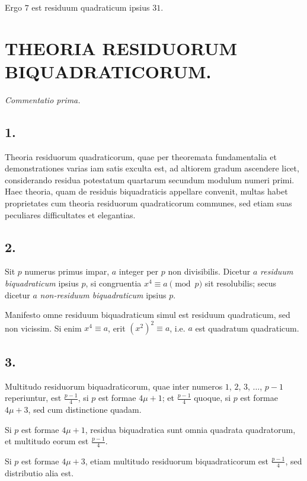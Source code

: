 \documentclass[12pt,a4paper]{article}
\theoremstyle{plain}
\theoremstyle{definition}
\theoremstyle{remark}
\begin{document}
Ergo $7$ est residuum quadraticum ipsius $31$.


\newpage
\section*{THEORIA RESIDUORUM BIQUADRATICORUM.}

\begin{center}
\textit{Commentatio prima.}
\end{center}

\subsection*{1.}
Theoria residuorum quadraticorum, quae per theoremata fundamentalia et demonstrationes varias iam satis exculta est, ad altiorem gradum ascendere licet, considerando residua potestatum quartarum secundum modulum numeri primi. Haec theoria, quam de residuis biquadraticis appellare convenit, multas habet proprietates cum theoria residuorum quadraticorum communes, sed etiam suas peculiares difficultates et elegantias.

\subsection*{2.}
Sit $p$ numerus primus impar, $a$ integer per $p$ non divisibilis. Dicetur $a$ \textit{residuum biquadraticum} ipsius $p$, si congruentia $x^4 \equiv a \pmod{p}$ sit resolubilis; secus dicetur $a$ \textit{non-residuum biquadraticum} ipsius $p$.

Manifesto omne residuum biquadraticum simul est residuum quadraticum, sed non vicissim. Si enim $x^4 \equiv a$, erit $(x^2)^2 \equiv a$, i.e. $a$ est quadratum quadraticum.

\subsection*{3.}
Multitudo residuorum biquadraticorum, quae inter numeros $1$, $2$, $3$, $\ldots$, $p-1$ reperiuntur, est $\frac{p-1}{4}$, si $p$ est formae $4\mu+1$; et $\frac{p-1}{4}$ quoque, si $p$ est formae $4\mu+3$, sed cum distinctione quadam.

Si $p$ est formae $4\mu+1$, residua biquadratica sunt omnia quadrata quadratorum, et multitudo eorum est $\frac{p-1}{4}$.

Si $p$ est formae $4\mu+3$, etiam multitudo residuorum biquadraticorum est $\frac{p-1}{4}$, sed distributio alia est.
\end{document}
